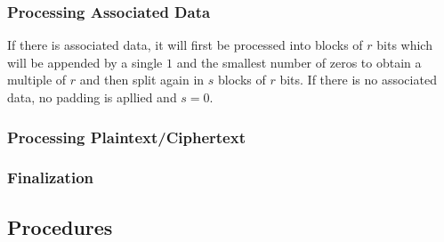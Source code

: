 \subsubsection{Processing Associated Data}
If there is associated data, it will first be processed into blocks of $r$ bits which will be appended by a single $1$ and the smallest number of zeros to obtain a multiple of $r$ and then split again in $s$ blocks of $r$ bits. If there is no associated data, no padding is apllied and $s=0$.

\subsubsection{Processing Plaintext/Ciphertext}
\subsubsection{Finalization}
\subsection{Procedures}